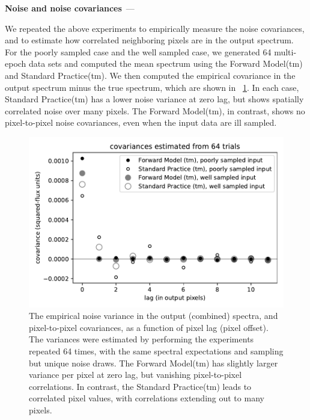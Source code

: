 \documentclass[modern]{aastex631}
\renewcommand{\paragraph}[1]{\medskip\par\noindent\textbf{#1}~---}
\newlength{\figurewidth}
\begin{document}
\paragraph{Noise and noise covariances}

We repeated the above experiments to empirically measure the noise covariances, and to estimate how correlated neighboring pixels are in the output spectrum. For the poorly sampled case and the well sampled case, we generated 64 multi-epoch data sets and computed the mean spectrum using the Forward Model(tm) and Standard Practice(tm). We then computed the empirical covariance in the output spectrum minus the true spectrum, which are shown in \figurename~\ref{fig:noise}.
In each case, Standard Practice(tm) has a lower noise variance at zero lag, but shows spatially correlated noise over many pixels.
The Forward Model(tm), in contrast, shows no pixel-to-pixel noise covariances, even when the input data are ill sampled.
\begin{figure}[t!]
    \begin{mdframed}\begin{center}
    \includegraphics[width=\figurewidth]{notebooks/noise.pdf}
    \end{center}
    \caption{The empirical noise variance in the output (combined) spectra, and pixel-to-pixel covariances, as a function of pixel lag (pixel offset). The variances were estimated by performing the experiments repeated 64 times, with the same spectral expectations and sampling but unique noise draws. The Forward Model(tm) has slightly larger variance per pixel at zero lag, but vanishing pixel-to-pixel correlations. In contrast, the Standard Practice(tm) leads to correlated pixel values, with correlations extending out to many pixels.\label{fig:noise}}
    \end{mdframed}
\end{figure}
\end{document}
